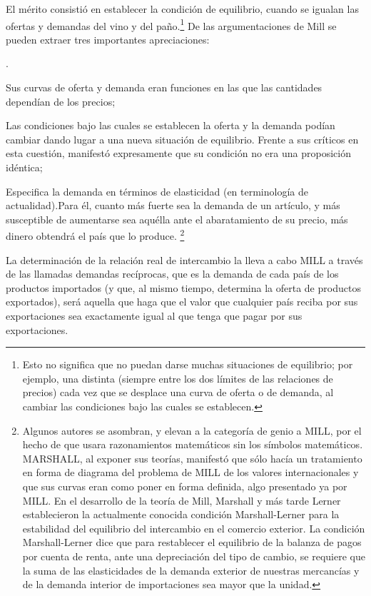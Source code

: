 \documentclass[10pt,a4paper]{article}
\newcounter{numitem}
\newenvironment{lnum}
      {\begin{list}{\arabic{numitem}.}{%
          \usecounter{numitem}%
          \setlength{\leftmargin}{1cm}%
          \setlength{\parskip}{3pt}%
          \setlength{\itemsep}{0pt}%
          \setlength{\parsep}{0pt}%
      }}
      {\end{list}}
\begin{document}
El mérito consistió en establecer la condición de equilibrio, cuando se igualan las ofertas y demandas del vino y del paño.\footnote{%
    Esto no significa que no puedan darse muchas situaciones de equilibrio; por ejemplo, una distinta (siempre entre los dos límites de las relaciones de precios) cada vez que se desplace una curva de oferta o de demanda, al cambiar las condiciones bajo las cuales se establecen.
} De las argumentaciones de Mill se pueden extraer tres importantes apreciaciones: 
\begin{lnum}
    \item Sus curvas de oferta y demanda eran funciones en las que las cantidades dependían de los precios;
    \item Las condiciones bajo las cuales se establecen la oferta y la demanda podían cambiar dando lugar a una nueva situación de equilibrio. Frente a sus críticos en esta cuestión, manifestó expresamente que su condición no era una proposición idéntica;
    \item Especifica la demanda en términos de elasticidad (en terminología de actualidad).Para él, cuanto más fuerte sea la demanda de un artículo, y más susceptible de aumentarse sea aquélla ante el abaratamiento de su precio, más dinero obtendrá el país que lo produce. \footnote{%
        Algunos autores se asombran, y elevan a la categoría de genio a MILL, por el hecho de que usara razonamientos matemáticos sin los símbolos matemáticos. MARSHALL, al exponer sus teorías, manifestó que sólo hacía un tratamiento en forma de diagrama del problema de MILL de los valores internacionales y que sus curvas eran como poner en forma definida, algo presentado ya por MILL. En el desarrollo de la teoría de Mill, Marshall y más tarde Lerner establecieron la actualmente conocida condición Marshall-Lerner para la estabilidad del equilibrio del intercambio en el comercio exterior. La condición Marshall-Lerner dice que para restablecer el equilibrio de la balanza de pagos por cuenta de renta, ante una depreciación del tipo de cambio, se requiere que la suma de las elasticidades de la demanda exterior de nuestras mercancías y de la demanda interior de importaciones sea mayor que la unidad.
    } 
\end{lnum}

La determinación de la relación real de intercambio la lleva a cabo MILL a través de las llamadas demandas recíprocas, que es la demanda de cada país de los productos importados (y que, al mismo tiempo, determina la oferta de productos exportados), será aquella que haga que el valor que cualquier país reciba por sus exportaciones sea exactamente igual al que tenga que pagar por sus exportaciones.
\end{document}
